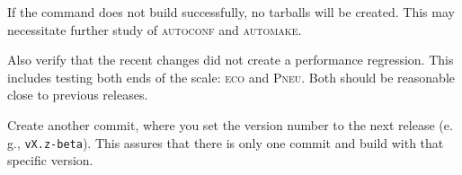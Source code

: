 \documentclass[a4paper,
  10pt,
  english,
  DIV=12,
  BCOR=8mm]{scrbook}
\newcommand{\algo}[1]{\textsc{{#1}}}
\newcommand{\eco}{\textsc{eco}\oldstylenums{29}\xspace}
\newcommand{\pneu}{\textsc{Pneu}\oldstylenums{3085}\xspace}
\begin{document}
If the command does not build successfully, no tarballs will be created. This may necessitate further study of \algo{autoconf} and \algo{automake}.

Also verify that the recent changes did not create a performance regression. This includes testing both ends of the scale: \eco and \pneu. Both should be reasonable close to previous releases.

Create another commit, where you set the version number to the next release (e.\,g., \lstinline$vX.z-beta$). This assures that there is only one commit and build with that specific version.

\backmatter

\end{document}
